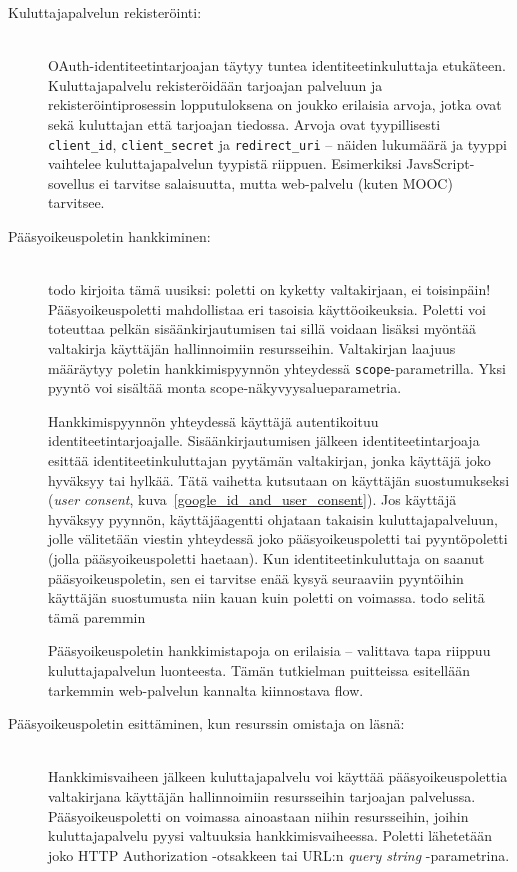 \documentclass[finnish,gradu]{tktltiki}
\begin{document}
  \begin{description}
    \item[Kuluttajapalvelun rekisteröinti:] \hfill \\
     OAuth-identiteetintarjoajan täytyy tuntea identiteetinkuluttaja etukäteen. Kuluttajapalvelu rekisteröidään tarjoajan palveluun ja rekisteröintiprosessin lopputuloksena on joukko erilaisia arvoja, jotka ovat sekä kuluttajan että tarjoajan tiedossa. Arvoja ovat tyypillisesti \verb!client_id!, \verb!client_secret! ja \verb!redirect_uri! -- näiden lukumäärä ja tyyppi vaihtelee kuluttajapalvelun tyypistä riippuen. Esimerkiksi JavsScript-sovellus ei tarvitse salaisuutta, mutta web-palvelu (kuten MOOC) tarvitsee.

    \item[Pääsyoikeuspoletin hankkiminen:] \hfill \\
  todo kirjoita tämä uusiksi: poletti on kyketty valtakirjaan, ei toisinpäin!
  Pääsyoikeuspoletti mahdollistaa eri tasoisia käyttöoikeuksia. Poletti voi toteuttaa pelkän sisäänkirjautumisen tai sillä voidaan lisäksi myöntää valtakirja käyttäjän hallinnoimiin resursseihin. Valtakirjan laajuus määräytyy poletin hankkimispyynnön yhteydessä \verb!scope!-parametrilla. Yksi pyyntö voi sisältää monta scope-näkyvyysalueparametria.

  Hankkimispyynnön yhteydessä käyttäjä autentikoituu identiteetintarjoajalle. Sisäänkirjautumisen jälkeen identiteetintarjoaja esittää identiteetinkuluttajan pyytämän valtakirjan, jonka käyttäjä joko hyväksyy tai hylkää. Tätä vaihetta kutsutaan on käyttäjän suostumukseksi (\emph{user consent}, kuva~\ref{google_id_and_user_consent}). Jos käyttäjä hyväksyy pyynnön, käyttäjäagentti ohjataan takaisin kuluttajapalveluun, jolle välitetään viestin yhteydessä joko pääsyoikeuspoletti tai pyyntöpoletti (jolla pääsyoikeuspoletti haetaan). Kun identiteetinkuluttaja on saanut pääsyoikeuspoletin, sen ei tarvitse enää kysyä seuraaviin pyyntöihin käyttäjän suostumusta niin kauan kuin poletti on voimassa. todo selitä tämä paremmin

  Pääsyoikeuspoletin hankkimistapoja on erilaisia -- valittava tapa riippuu kuluttajapalvelun luonteesta.
  Tämän tutkielman puitteissa esitellään tarkemmin web-palvelun kannalta kiinnostava flow.

    \item[Pääsyoikeuspoletin esittäminen, kun resurssin omistaja on läsnä:] \hfill \\
  Hankkimisvaiheen jälkeen kuluttajapalvelu voi käyttää pääsyoikeuspolettia valtakirjana käyttäjän hallinnoimiin resursseihin tarjoajan palvelussa. Pääsyoikeuspoletti on voimassa ainoastaan niihin resursseihin, joihin kuluttajapalvelu pyysi valtuuksia hankkimisvaiheessa. Poletti lähetetään joko HTTP Authorization -otsakkeen tai URL:n \emph{query string} -parametrina.


\end{description}
\end{document}
